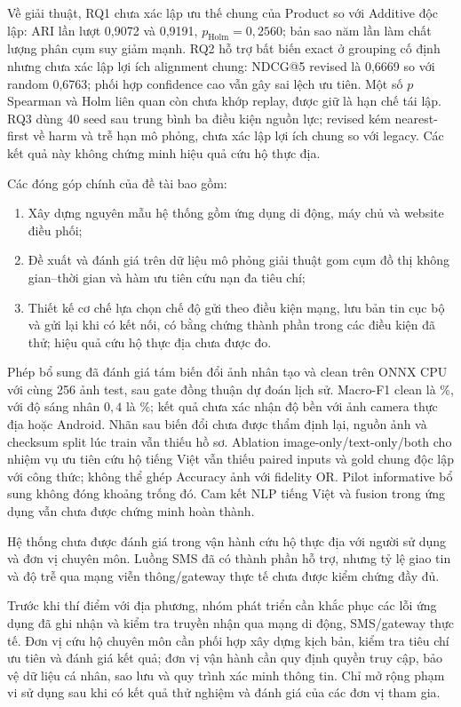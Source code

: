 Về giải thuật, RQ1 chưa xác lập ưu thế chung của Product so với Additive độc lập: ARI lần lượt 0,9072 và 0,9191, $p_{\mathrm{Holm}}=0{,}2560$; bản sao năm lần làm chất lượng phân cụm suy giảm mạnh. RQ2 hỗ trợ bất biến exact ở grouping cố định nhưng chưa xác lập lợi ích alignment chung: NDCG@5 revised là 0,6669 so với random 0,6763; phối hợp confidence cao vẫn gây sai lệch ưu tiên. Một số $p$ Spearman và Holm liên quan còn chưa khớp replay, được giữ là hạn chế tái lập. RQ3 dùng 40 seed sau trung bình ba điều kiện nguồn lực; revised kém nearest-first về harm và trễ hạn mô phỏng, chưa xác lập lợi ích chung so với legacy. Các kết quả này không chứng minh hiệu quả cứu hộ thực địa.

Các đóng góp chính của đề tài bao gồm:
\begin{enumerate}
\item Xây dựng nguyên mẫu hệ thống gồm ứng dụng di động, máy chủ và website điều phối;
\item Đề xuất và đánh giá trên dữ liệu mô phỏng giải thuật gom cụm đồ thị không gian--thời gian và hàm ưu tiên cứu nạn đa tiêu chí;
\item Thiết kế cơ chế lựa chọn chế độ gửi theo điều kiện mạng, lưu bản tin cục bộ và gửi lại khi có kết nối, có bằng chứng thành phần trong các điều kiện đã thử; hiệu quả cứu hộ thực địa chưa được đo.
\end{enumerate}

Phép bổ sung đã đánh giá tám biến đổi ảnh nhân tạo và clean trên ONNX CPU với cùng 256 ảnh test, sau gate đồng thuận dự đoán lịch sử. Macro-F1 clean là \QualityCleanMacroFOne\%, với độ sáng nhân $0{,}4$ là \QualityDarkMacroFOne\%; kết quả chưa xác nhận độ bền với ảnh camera thực địa hoặc Android. Nhãn sau biến đổi chưa được thẩm định lại, nguồn ảnh và checksum split lúc train vẫn thiếu hồ sơ. Ablation image-only/text-only/both cho nhiệm vụ ưu tiên cứu hộ tiếng Việt vẫn thiếu paired inputs và gold chung độc lập với công thức; không thể ghép Accuracy ảnh với fidelity OR. Pilot informative bổ sung không đóng khoảng trống đó. Cam kết NLP tiếng Việt và fusion trong ứng dụng vẫn chưa được chứng minh hoàn thành.

Hệ thống chưa được đánh giá trong vận hành cứu hộ thực địa với người sử dụng và đơn vị chuyên môn. Luồng SMS đã có thành phần hỗ trợ, nhưng tỷ lệ giao tin và độ trễ qua mạng viễn thông/gateway thực tế chưa được kiểm chứng đầy đủ.

Trước khi thí điểm với địa phương, nhóm phát triển cần khắc phục các lỗi ứng dụng đã ghi nhận và kiểm tra truyền nhận qua mạng di động, SMS/gateway thực tế. Đơn vị cứu hộ chuyên môn cần phối hợp xây dựng kịch bản, kiểm tra tiêu chí ưu tiên và đánh giá kết quả; đơn vị vận hành cần quy định quyền truy cập, bảo vệ dữ liệu cá nhân, sao lưu và quy trình xác minh thông tin. Chỉ mở rộng phạm vi sử dụng sau khi có kết quả thử nghiệm và đánh giá của các đơn vị tham gia.

